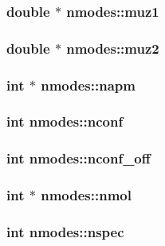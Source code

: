 \subsubsection{\setlength{\rightskip}{0pt plus 5cm}double $\ast$ {\bf nmodes::muz1}}\label{structnmodes_8fb0bc0d55e9c255556ee93746dca923}


\subsubsection{\setlength{\rightskip}{0pt plus 5cm}double $\ast$ {\bf nmodes::muz2}}\label{structnmodes_a01fa6d10258477b23c5eaec69d57454}


\subsubsection{\setlength{\rightskip}{0pt plus 5cm}int $\ast$ {\bf nmodes::napm}}\label{structnmodes_97aff6e541da9c37a811911160b72f92}


\subsubsection{\setlength{\rightskip}{0pt plus 5cm}int {\bf nmodes::nconf}}\label{structnmodes_49684e91f94277deb0b0c51a693b4143}


\subsubsection{\setlength{\rightskip}{0pt plus 5cm}int {\bf nmodes::nconf\_\-off}}\label{structnmodes_5600dc7e1668480937490b37469b9fa8}


\subsubsection{\setlength{\rightskip}{0pt plus 5cm}int $\ast$ {\bf nmodes::nmol}}\label{structnmodes_4762862289e78fc21f0ce89ba52a8c5b}


\subsubsection{\setlength{\rightskip}{0pt plus 5cm}int {\bf nmodes::nspec}}\label{structnmodes_f488f4f5ac76bd5e3bb56e42eb30a61a}


